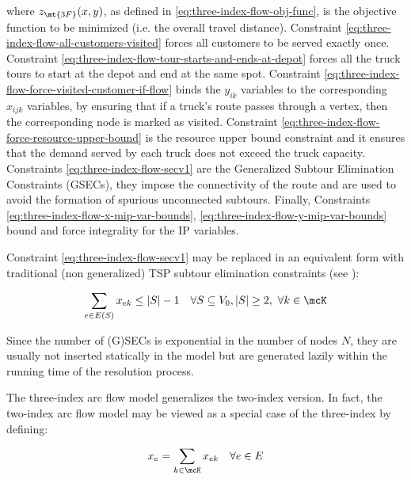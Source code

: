 where $z_\mt{3F}(x, y)$, as defined in \eqref{eq:three-index-flow-obj-func}, is the objective function to be minimized (i.e. the overall travel distance).
Constraint \eqref{eq:three-index-flow-all-customers-visited} forces all customers to be served exactly once.
Constraint \eqref{eq:three-index-flow-tour-starts-and-ends-at-depot} forces all the truck tours to start at the depot and end at the same spot.
Constraint \eqref{eq:three-index-flow-force-visited-customer-if-flow} binds the $y_{ik}$ variables to the corresponding $x_{ijk}$ variables, by ensuring that if a truck's route passes through a vertex, then the corresponding node is marked as visited.
Constraint \eqref{eq:three-index-flow-force-resource-upper-bound} is the resource upper bound constraint and it ensures that the demand served by each truck does not exceed the truck capacity.
Constraints \eqref{eq:three-index-flow-secv1} are the Generalized Subtour Elimination Constraints (GSECs), they impose the connectivity of the route and are used to avoid the formation of spurious unconnected subtours.
Finally, Constraints \eqref{eq:three-index-flow-x-mip-var-bounds}, \eqref{eq:three-index-flow-y-mip-var-bounds} bound and force integrality for the IP variables.

Constraint \eqref{eq:three-index-flow-secv1} may be replaced in an equivalent form with traditional (non generalized) TSP subtour elimination constraints (see \textcite{fisher1981}):

\begin{equation}\label{eq:three-index-flow-secv2}
	\sum_{e \in E(S)} x_{ek} \le |S| - 1 \quad \forall S \subseteq V_0, |S| \ge 2,\ \forall k \in \mcK
\end{equation}

Since the number of (G)SECs is exponential in the number of nodes $N$, they are usually not inserted statically in the model but are generated lazily within the running time of the resolution process.

The three-index arc flow model generalizes the two-index version.
In fact, the two-index arc flow model may be viewed as a special case of the three-index by defining:

\begin{equation}
	x_e = \sum_{k \in \mcK} x_{ek} \quad \forall e \in E
\end{equation}



